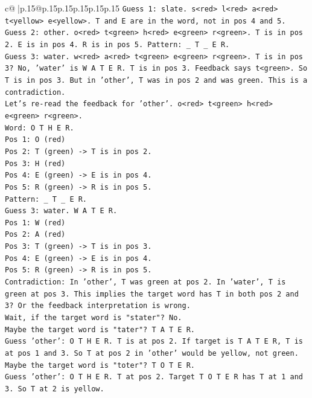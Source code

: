 \documentclass{article}
\begin{document}
{\begin{supertabular}{c@{$\;$}|p{.15\linewidth}@{}p{.15\linewidth}p{.15\linewidth}p{.15\linewidth}p{.15\linewidth}p{.15\linewidth}}
{{{\texttt{Guess 1: slate. s<red> l<red> a<red> t<yellow> e<yellow>. T and E are in the word, not in pos 4 and 5.} \\
\texttt{Guess 2: other. o<red> t<green> h<red> e<green> r<green>. T is in pos 2. E is in pos 4. R is in pos 5. Pattern: \_ T \_ E R.} \\
\texttt{Guess 3: water. w<red> a<red> t<green> e<green> r<green>. T is in pos 3? No, 'water' is W A T E R. T is in pos 3. Feedback says t<green>. So T is in pos 3. But in 'other', T was in pos 2 and was green. This is a contradiction.} \\
\texttt{Let's re{-}read the feedback for 'other'. o<red> t<green> h<red> e<green> r<green>.} \\
\texttt{Word: O T H E R.} \\
\texttt{Pos 1: O (red)} \\
\texttt{Pos 2: T (green) {-}> T is in pos 2.} \\
\texttt{Pos 3: H (red)} \\
\texttt{Pos 4: E (green) {-}> E is in pos 4.} \\
\texttt{Pos 5: R (green) {-}> R is in pos 5.} \\
\texttt{Pattern: \_ T \_ E R.} \\
\texttt{Guess 3: water. W A T E R.} \\
\texttt{Pos 1: W (red)} \\
\texttt{Pos 2: A (red)} \\
\texttt{Pos 3: T (green) {-}> T is in pos 3.} \\
\texttt{Pos 4: E (green) {-}> E is in pos 4.} \\
\texttt{Pos 5: R (green) {-}> R is in pos 5.} \\
\texttt{Contradiction: In 'other', T was green at pos 2. In 'water', T is green at pos 3. This implies the target word has T in both pos 2 and 3? Or the feedback interpretation is wrong.} \\
\texttt{Wait, if the target word is "stater"? No.} \\
\texttt{Maybe the target word is "tater"? T A T E R.} \\
\texttt{Guess 'other': O T H E R. T is at pos 2. If target is T A T E R, T is at pos 1 and 3. So T at pos 2 in 'other' would be yellow, not green.} \\
\texttt{Maybe the target word is "toter"? T O T E R.} \\
\texttt{Guess 'other': O T H E R. T at pos 2. Target T O T E R has T at 1 and 3. So T at 2 is yellow.} \\
}}}
\end{supertabular}}
\end{document}
